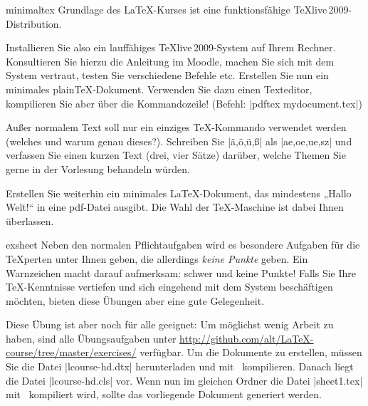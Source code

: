 \documentclass[
	solution,
	blatt=1,
	ausgabe=16.\,04.\,2010,
	rückgabe=23.\,04.\,2010
]{lcourse-hd}
\begin{document}
\begin{exercise}[name=Minimales \TeX-Dokument,punkte=10,abgabe = Beide Quelltexte per Mail{,} das fertige \TeX-Dokument als Ausdruck.]{minimaltex}
Grundlage des \LaTeX-Kurses ist eine funktionsfähige \TeX live\,2009-Distribution. 

Installieren Sie also ein lauffähiges \TeX live\,2009-System auf Ihrem Rechner. Konsultieren Sie hierzu die Anleitung im Moodle, machen Sie sich mit dem System vertraut, testen Sie verschiedene Befehle etc.
Erstellen Sie nun ein minimales plain\TeX-Dokument. Verwenden Sie dazu einen Texteditor, kompilieren Sie aber über die Kommandozeile! (Befehl: |pdftex mydocument.tex|)

Außer normalem Text soll nur ein einziges \TeX-Kommando verwendet werden (welches und warum genau dieses?). Schreiben Sie |ä,ö,ü,ß| als |ae,oe,ue,sz| und verfassen Sie einen kurzen Text (drei, vier Sätze) darüber, welche Themen Sie gerne in der Vorlesung behandeln würden.

Erstellen Sie weiterhin ein minimales \LaTeX-Dokument, das mindestens „Hallo Welt!“ in eine pdf-Datei ausgibt. Die Wahl der \TeX-Maschine ist dabei Ihnen überlassen.
\end{exercise}

\begin{expertexercise}[
	name=Übungsblätter selbst erstellen,
	abgabe = Keine Abgabe nötig.
]{exsheet}
Neben den normalen Pflichtaufgaben wird es besondere Aufgaben für die \TeX perten unter Ihnen geben, die allerdings \emph{keine Punkte} geben. Ein Warnzeichen macht darauf aufmerksam: schwer und keine Punkte! \raisebox{1ex}{\font\manualtiny=manfnt at 6pt\manualtiny\char127} Falls Sie Ihre \TeX-Kenntnisse vertiefen und sich eingehend mit dem System beschäftigen möchten, bieten diese Übungen aber eine gute Gelegenheit.

Diese Übung ist aber noch für alle geeignet: Um möglichst wenig Arbeit zu haben, sind alle Übungsaufgaben unter \url{http://github.com/alt/LaTeX-course/tree/master/exercises/} verfügbar. Um die Dokumente zu erstellen, müssen Sie die Datei |lcourse-hd.dtx| herunterladen und mit \XeLaTeX\ kompilieren. Danach liegt die Datei |lcourse-hd.cls| vor. Wenn nun im gleichen Ordner die Datei |sheet1.tex| mit \XeLaTeX\ kompiliert wird, sollte das vorliegende Dokument generiert werden.

\end{expertexercise}
\end{document}
